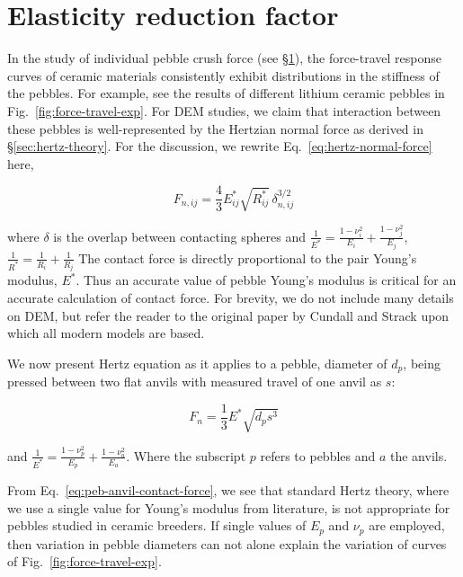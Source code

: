 \section{Elasticity reduction factor}\label{sec:exp-reduction-factor}

In the study of individual pebble crush force (see \S\ref{sec:exp-reduction-factor}), the force-travel response curves of ceramic materials consistently exhibit distributions in the stiffness of the pebbles. For example, see the results of different lithium ceramic pebbles in Fig.~\ref{fig:force-travel-exp}. For DEM studies, we claim that interaction between these pebbles is well-represented by the Hertzian normal force as derived in \S\ref{sec:hertz-theory}. For the discussion, we rewrite Eq.~\ref{eq:hertz-normal-force} here,


\begin{equation}
  F_{n,ij} = \frac{4}{3}E_{ij}^* \sqrt{R_{ij}^*} \, \delta_{n,ij}^{3/2}
\end{equation}

where $\delta$ is the overlap between contacting spheres and $\frac{1}{E^*} = \frac{1-\nu_i^2}{E_i} + \frac{1-\nu_j^2}{E_j}$, $\frac{1}{R^*} = \frac{1}{R_i} + \frac{1}{R_j}$
The contact force is directly proportional to the pair Young's modulus, $E^*$. Thus an accurate value of pebble Young's modulus is critical for an accurate calculation of contact force. For brevity, we do not include many details on DEM, but refer the reader to the original paper by Cundall and Strack\cite{Cundall1979} upon which all modern models are based.

We now present Hertz equation as it applies to a pebble, diameter of $d_p$, being pressed between two flat anvils with measured travel of one anvil as $s$:

\begin{equation}\label{eq:peb-anvil-contact-force}
  F_n = \frac{1}{3}E^*\sqrt{d_ps^3}
\end{equation} 

and $\frac{1}{E^*} = \frac{1-\nu_p^2}{E_p} + \frac{1-\nu_a^2}{E_a}$. Where the subscript $p$ refers to pebbles and $a$ the anvils.

From Eq.~\ref{eq:peb-anvil-contact-force}, we see that standard Hertz theory, where we use a single value for Young's modulus from literature, is not appropriate for pebbles studied in ceramic breeders. If single values of $E_p$ and $\nu_p$ are employed, then variation in pebble diameters can not alone explain the variation of curves of Fig.~\ref{fig:force-travel-exp}.
